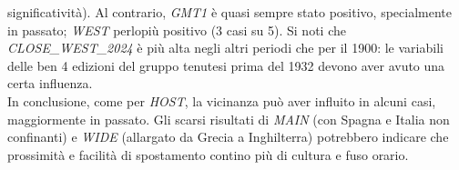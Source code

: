 significatività). Al contrario, \textit{GMT1} è quasi sempre stato positivo,
specialmente in passato; \textit{WEST} perlopiù positivo (3 casi su 5). Si noti
che \textit{CLOSE\_WEST\_2024} è più alta negli altri periodi che per il 1900:
le variabili delle ben 4 edizioni del gruppo tenutesi prima del 1932 devono aver
avuto una certa influenza.\\
In conclusione, come per \textit{HOST}, la vicinanza può aver influito in alcuni
casi, maggiormente in passato. Gli scarsi risultati di \textit{MAIN} (con Spagna
e Italia non confinanti) e \textit{WIDE} (allargato da Grecia a Inghilterra)
potrebbero indicare che prossimità e facilità di spostamento contino più di
cultura e fuso orario.


\begin{table}[H]
\centering
\caption{Confronto Modelli OLS Top 40: Effetto Host e Variabili Macroeconomiche per diversi Periodi e Lag}
\label{tab:ols_timeframes}
\renewcommand{\arraystretch}{1} %
\footnotesize %
\end{table}
